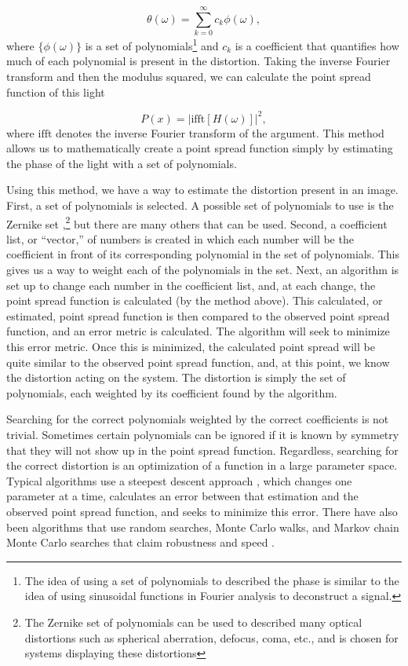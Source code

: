 \begin{equation}
  \theta (\omega) = \sum _{k=0} ^{\infty} c_k \phi (\omega),
  \label{phasesuma}
\end{equation}
%
where $\{\phi (\omega) \}$ is a set of polynomials\footnote{The idea of using a set of polynomials to described the phase is similar to the idea of using sinusoidal functions in Fourier analysis to deconstruct a signal.} and $c_k$ is a coefficient that quantifies how much of each polynomial is present in the distortion. Taking the inverse Fourier transform and then the modulus squared, we can calculate the point spread function of this light

\begin{equation}
		P(x) = \Big|\text{ifft}[H(\omega)]\Big|^2,
  \label{otftopsfa}
\end{equation}
%
where $\text{ifft}$ denotes the inverse Fourier transform of the argument. This method allows us to mathematically create a point spread function simply by estimating the phase of the light with a set of polynomials.

Using this method, we have a way to estimate the distortion present in an image. First, a set of polynomials is selected. A possible set of polynomials to use is the Zernike set \cite{Gonsalves1982},\footnote{The Zernike set of polynomials can be used to described many optical distortions such as spherical aberration, defocus, coma, etc., and is chosen for systems displaying these distortions} but there are many others that can be used. Second, a coefficient list, or ``vector,'' of numbers is created in which each number will be the coefficient in front of its corresponding polynomial in the set of polynomials. This gives us a way to weight each of the polynomials in the set. Next, an algorithm is set up to change each number in the coefficient list, and, at each change, the point spread function is calculated (by the method above). This calculated, or estimated, point spread function is then compared to the observed point spread function, and an error metric is calculated. The algorithm will seek to minimize this error metric. Once this is minimized, the calculated point spread will be quite similar to the observed point spread function, and, at this point, we know the distortion acting on the system. The distortion is simply the set of polynomials, each weighted by its coefficient found by the algorithm.


Searching for the correct polynomials weighted by the correct coefficients is not trivial. Sometimes certain polynomials can be ignored if it is known by symmetry that they will not show up in the point spread function. Regardless, searching for the correct distortion is an optimization of a function in a large parameter space. Typical algorithms use a steepest descent approach \cite{Gonsalves1982}, which changes one parameter at a time, calculates an error between that estimation and the observed point spread function, and seeks to minimize this error. There have also been algorithms that use random searches, Monte Carlo walks, and Markov chain Monte Carlo searches that claim robustness and speed \cite{fienup}.

